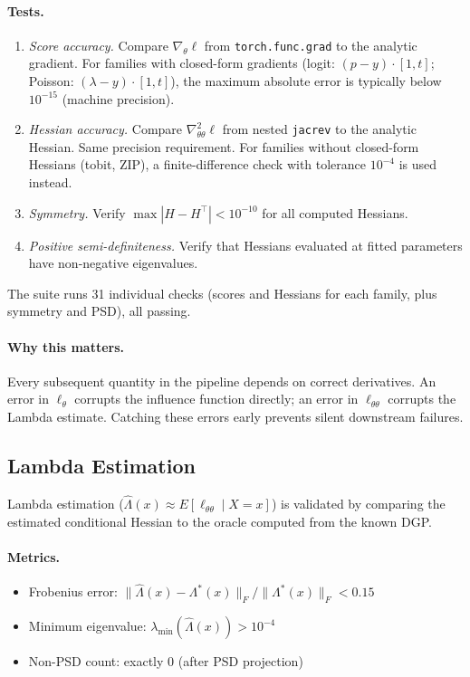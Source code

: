 \paragraph{Tests.}
\begin{enumerate}
    \item \emph{Score accuracy.} Compare $\nabla_\theta \ell$ from \texttt{torch.func.grad} to the analytic gradient. For families with closed-form gradients (logit: $(p-y) \cdot [1, t]$; Poisson: $(\lambda - y) \cdot [1,t]$), the maximum absolute error is typically below $10^{-15}$ (machine precision).
    \item \emph{Hessian accuracy.} Compare $\nabla^2_{\theta\theta} \ell$ from nested \texttt{jacrev} to the analytic Hessian. Same precision requirement. For families without closed-form Hessians (tobit, ZIP), a finite-difference check with tolerance $10^{-4}$ is used instead.
    \item \emph{Symmetry.} Verify $\max|H - H^\top| < 10^{-10}$ for all computed Hessians.
    \item \emph{Positive semi-definiteness.} Verify that Hessians evaluated at fitted parameters have non-negative eigenvalues.
\end{enumerate}

The suite runs 31 individual checks (scores and Hessians for each family, plus symmetry and PSD), all passing.

\paragraph{Why this matters.} Every subsequent quantity in the pipeline depends on correct derivatives. An error in $\ell_\theta$ corrupts the influence function directly; an error in $\ell_{\theta\theta}$ corrupts the Lambda estimate. Catching these errors early prevents silent downstream failures.

\subsection{Lambda Estimation}\label{sec:eval_lambda}

Lambda estimation ($\hat{\Lambda}(x) \approx E[\ell_{\theta\theta} \mid X\!=\!x]$) is validated by comparing the estimated conditional Hessian to the oracle computed from the known DGP.

\paragraph{Metrics.}
\begin{itemize}
    \item Frobenius error: $\|{\hat{\Lambda}(x) - \Lambda^*(x)}\|_F / \|{\Lambda^*(x)}\|_F < 0.15$
    \item Minimum eigenvalue: $\lambda_{\min}(\hat{\Lambda}(x)) > 10^{-4}$
    \item Non-PSD count: exactly 0 (after PSD projection)
\end{itemize}

